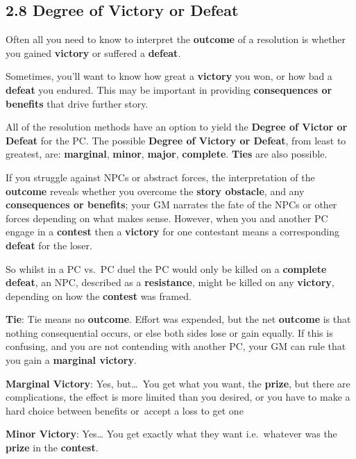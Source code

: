 \documentclass[
]{article}
\begin{document}
\hypertarget{degree-of-victory-or-defeat}{%
\subsection{2.8 Degree of Victory or
Defeat}\label{degree-of-victory-or-defeat}}

Often all you need to know to interpret the \textbf{outcome} of a
resolution is whether you gained \textbf{victory} or suffered a
\textbf{defeat}.

Sometimes, you'll want to know how great a \textbf{victory} you won, or
how bad a \textbf{defeat} you endured. This may be important in
providing \textbf{consequences or benefits} that drive further story.

All of the resolution methods have an option to yield the \textbf{Degree
of Victor or Defeat} for the PC. The possible \textbf{Degree of Victory
or Defeat}, from least to greatest, are: \textbf{marginal},
\textbf{minor}, \textbf{major}, \textbf{complete}. \textbf{Ties} are
also possible.

If you struggle against NPCs or abstract forces, the interpretation of
the \textbf{outcome} reveals whether you overcome the \textbf{story
obstacle}, and any \textbf{consequences or benefits}; your GM narrates
the fate of the NPCs or other forces depending on what makes sense.
However, when you and another PC engage in a \textbf{contest} then a
\textbf{victory} for one contestant means a corresponding
\textbf{defeat} for the loser.

So whilst in a PC vs.~PC duel the PC would only be killed on a
\textbf{complete defeat}, an NPC, described as a \textbf{resistance},
might be killed on any \textbf{victory}, depending on how the
\textbf{contest} was framed.

\textbf{Tie}: Tie means no \textbf{outcome}. Effort was expended, but
the net \textbf{outcome} is that nothing consequential occurs, or else
both sides lose or gain equally. If this is confusing, and you are not
contending with another PC, your GM can rule that you gain a
\textbf{marginal victory}.

\textbf{Marginal Victory}: Yes, but\ldots~You get what you want, the
\textbf{prize}, but there are complications, the effect is more limited
than you desired, or you have to make a hard choice between benefits
or~accept a loss to get one

\textbf{Minor Victory}: Yes\ldots{} You get exactly what they want
i.e.~whatever was the \textbf{prize} in the \textbf{contest}.
\end{document}
